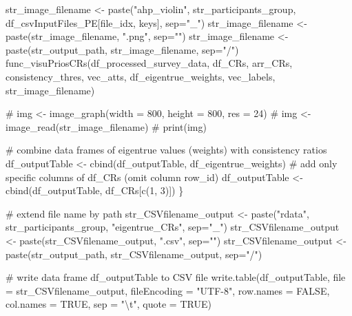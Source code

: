 \documentclass[
]{article}
\newenvironment{Shaded}{\begin{snugshade}}{\end{snugshade}}
\newcommand{\AttributeTok}[1]{\textcolor[rgb]{0.00,0.34,0.68}{#1}}
\newcommand{\CommentTok}[1]{\textcolor[rgb]{0.54,0.53,0.53}{#1}}
\newcommand{\ConstantTok}[1]{\textcolor[rgb]{0.67,0.33,0.00}{#1}}
\newcommand{\DecValTok}[1]{\textcolor[rgb]{0.69,0.50,0.00}{#1}}
\newcommand{\FunctionTok}[1]{\textcolor[rgb]{0.39,0.29,0.61}{#1}}
\newcommand{\NormalTok}[1]{\textcolor[rgb]{0.12,0.11,0.11}{#1}}
\newcommand{\OtherTok}[1]{\textcolor[rgb]{0.00,0.43,0.16}{#1}}
\newcommand{\SpecialCharTok}[1]{\textcolor[rgb]{0.24,0.68,0.91}{#1}}
\newcommand{\StringTok}[1]{\textcolor[rgb]{0.75,0.01,0.01}{#1}}
\begin{document}
\begin{Shaded}
\begin{Highlighting}[]
\NormalTok{  str\_image\_filename }\OtherTok{\textless{}{-}} \FunctionTok{paste}\NormalTok{(}\StringTok{"ahp\_violin"}\NormalTok{, str\_participants\_group, df\_csvInputFiles\_PE[file\_idx, keys], }\AttributeTok{sep=}\StringTok{"\_"}\NormalTok{)}
\NormalTok{  str\_image\_filename }\OtherTok{\textless{}{-}} \FunctionTok{paste}\NormalTok{(str\_image\_filename, }\StringTok{".png"}\NormalTok{, }\AttributeTok{sep=}\StringTok{""}\NormalTok{)}
\NormalTok{  str\_image\_filename }\OtherTok{\textless{}{-}} \FunctionTok{paste}\NormalTok{(str\_output\_path, str\_image\_filename, }\AttributeTok{sep=}\StringTok{"/"}\NormalTok{)}
  \FunctionTok{func\_visuPriosCRs}\NormalTok{(df\_processed\_survey\_data, df\_CRs, arr\_CRs, consistency\_thres, vec\_atts, df\_eigentrue\_weights, vec\_labels, str\_image\_filename)}
  
  \CommentTok{\# img \textless{}{-} image\_graph(width = 800, height = 800, res = 24)}
  \CommentTok{\# img \textless{}{-} image\_read(str\_image\_filename)}
  \CommentTok{\# print(img)}
  
  \CommentTok{\# combine data frames of eigentrue values (weights) with consistency ratios}
\NormalTok{  df\_outputTable }\OtherTok{\textless{}{-}} \FunctionTok{cbind}\NormalTok{(df\_outputTable, df\_eigentrue\_weights)}
  \CommentTok{\# add only specific columns of \textquotesingle{}df\_CRs\textquotesingle{} (omit column \textquotesingle{}row\_id\textquotesingle{})}
\NormalTok{  df\_outputTable }\OtherTok{\textless{}{-}} \FunctionTok{cbind}\NormalTok{(df\_outputTable, df\_CRs[}\FunctionTok{c}\NormalTok{(}\DecValTok{1}\NormalTok{, }\DecValTok{3}\NormalTok{)])}
\NormalTok{\}}

\CommentTok{\# extend file name by path}
\NormalTok{str\_CSVfilename\_output }\OtherTok{\textless{}{-}} \FunctionTok{paste}\NormalTok{(}\StringTok{"rdata"}\NormalTok{, str\_participants\_group, }\StringTok{"eigentrue\_CRs"}\NormalTok{, }\AttributeTok{sep=}\StringTok{"\_"}\NormalTok{)}
\NormalTok{str\_CSVfilename\_output }\OtherTok{\textless{}{-}} \FunctionTok{paste}\NormalTok{(str\_CSVfilename\_output, }\StringTok{".csv"}\NormalTok{, }\AttributeTok{sep=}\StringTok{""}\NormalTok{)}
\NormalTok{str\_CSVfilename\_output }\OtherTok{\textless{}{-}} \FunctionTok{paste}\NormalTok{(str\_output\_path, str\_CSVfilename\_output, }\AttributeTok{sep=}\StringTok{"/"}\NormalTok{)}

\CommentTok{\# write data frame \textquotesingle{}df\_outputTable\textquotesingle{} to CSV file}
\FunctionTok{write.table}\NormalTok{(df\_outputTable, }\AttributeTok{file =}\NormalTok{ str\_CSVfilename\_output,}
            \AttributeTok{fileEncoding =} \StringTok{"UTF{-}8"}\NormalTok{, }\AttributeTok{row.names =} \ConstantTok{FALSE}\NormalTok{,}
            \AttributeTok{col.names =} \ConstantTok{TRUE}\NormalTok{, }\AttributeTok{sep =} \StringTok{"}\SpecialCharTok{\textbackslash{}t}\StringTok{"}\NormalTok{, }\AttributeTok{quote =} \ConstantTok{TRUE}\NormalTok{)}
\end{Highlighting}
\end{Shaded}
\end{document}
